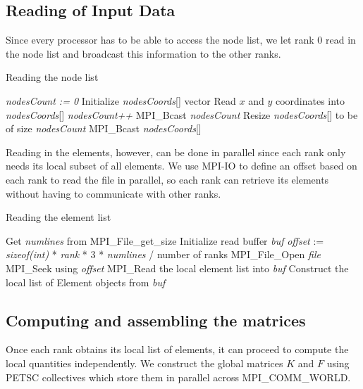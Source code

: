 \documentclass[12pt,notitlepage]{extreport}
\begin{document}
\subsection*{Reading of Input Data}
 Since every processor has to be able to access the node list, we let rank 0 read in the node list and broadcast this information to the other ranks.
\begin{algorithm}[htp]
  \caption{Reading the node list}
  \begin{algorithmic}
     
    \State \textit{nodesCount := 0}
    \State Initialize \textit{nodesCoords}[] vector
    \State Read $x$ and $y$ coordinates into \textit{nodesCoords}[]
    \State \textit{nodesCount++}
    \EndFor
    \EndIf
    \State MPI\_Bcast \textit{nodesCount}
    \State Resize \textit{nodesCoords}[] to be of size \textit{nodesCount}
    \State MPI\_Bcast \textit{nodesCoords}[]
    \EndProcedure
  \end{algorithmic}
\end{algorithm}

Reading in the elements, however, can be done in parallel since each rank only needs its local subset of all elements. We use MPI-IO to define an offset based on each rank to read the file in parallel, so each rank can retrieve its elements without having to communicate with other ranks.
\begin{algorithm}[htp]
  \caption{Reading the element list}
  \begin{algorithmic}
    \State Get \textit{numlines} from MPI\_File\_get\_size
    \State Initialize read buffer \textit{buf}
    \State \textit{offset} := \textit{sizeof(int)} * \textit{rank} * 3 * \textit{numlines} / number of ranks
    \State MPI\_File\_Open \textit{file}
    \State MPI\_Seek using \textit{offset}
    \State MPI\_Read the local element list into \textit{buf}
    \State Construct the local list of Element objects from \textit{buf}
    \EndProcedure
  \end{algorithmic}
\end{algorithm}

\subsection*{Computing and assembling the matrices}
Once each rank obtains its local list of elements, it can proceed to compute the local quantities independently. We construct the global matrices $K$ and $F$ using PETSC collectives which store them in parallel across MPI\_COMM\_WORLD.
\end{document}
